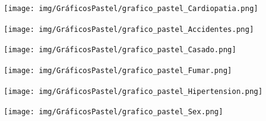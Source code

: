 \documentclass[a4paper, 12pt]{article}
\begin{document}
\begin{figure}[H]
    \centering
    \begin{minipage}{0.45\textwidth}
        \centering
        \texttt{[image: img/GráficosPastel/grafico\_pastel\_Cardiopatia.png]}
    \end{minipage}
    \begin{minipage}{0.45\textwidth}
        \centering
        \texttt{[image: img/GráficosPastel/grafico\_pastel\_Accidentes.png]}
    \end{minipage}
    \vfill
    \begin{minipage}{0.45\textwidth}
        \centering
        \texttt{[image: img/GráficosPastel/grafico\_pastel\_Casado.png]}
    \end{minipage}
    \begin{minipage}{0.45\textwidth}
        \centering
        \texttt{[image: img/GráficosPastel/grafico\_pastel\_Fumar.png]}
    \end{minipage}
    \vfill
    \begin{minipage}{0.45\textwidth}
        \centering
        \texttt{[image: img/GráficosPastel/grafico\_pastel\_Hipertension.png]}
    \end{minipage}
    \begin{minipage}{0.45\textwidth}
        \centering
        \texttt{[image: img/GráficosPastel/grafico\_pastel\_Sex.png]}
    \end{minipage}
    \vfill
\end{figure}
\end{document}
